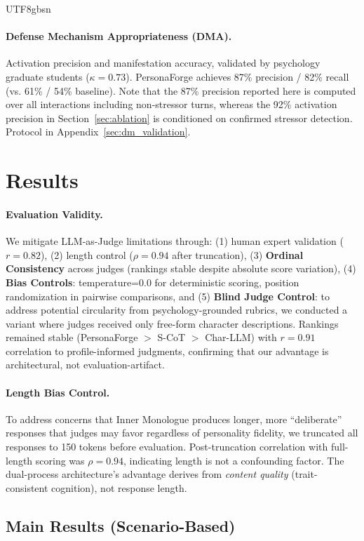 \documentclass[11pt]{article}
\begin{document}
\begin{CJK*}{UTF8}{gbsn}
\paragraph{Defense Mechanism Appropriateness (DMA).} Activation precision and manifestation accuracy, validated by psychology graduate students ($\kappa=0.73$). PersonaForge achieves 87\% precision / 82\% recall (vs. 61\% / 54\% baseline). Note that the 87\% precision reported here is computed over all interactions including non-stressor turns, whereas the 92\% activation precision in Section~\ref{sec:ablation} is conditioned on confirmed stressor detection. Protocol in Appendix~\ref{sec:dm_validation}.

\section{Results}

\paragraph{Evaluation Validity.} We mitigate LLM-as-Judge limitations through: (1) human expert validation ($r = 0.82$), (2) length control ($\rho=0.94$ after truncation), (3) \textbf{Ordinal Consistency} across judges (rankings stable despite absolute score variation), (4) \textbf{Bias Controls}: temperature=0.0 for deterministic scoring, position randomization in pairwise comparisons, and (5) \textbf{Blind Judge Control}: to address potential circularity from psychology-grounded rubrics, we conducted a variant where judges received only free-form character descriptions. Rankings remained stable (PersonaForge $>$ S-CoT $>$ Char-LLM) with $r=0.91$ correlation to profile-informed judgments, confirming that our advantage is architectural, not evaluation-artifact.

\paragraph{Length Bias Control.} To address concerns that Inner Monologue produces longer, more ``deliberate'' responses that judges may favor regardless of personality fidelity, we truncated all responses to 150 tokens before evaluation. Post-truncation correlation with full-length scoring was $\rho=0.94$, indicating length is not a confounding factor. The dual-process architecture's advantage derives from \textit{content quality} (trait-consistent cognition), not response length.


\subsection{Main Results (Scenario-Based)}


\end{CJK*}
\end{document}
